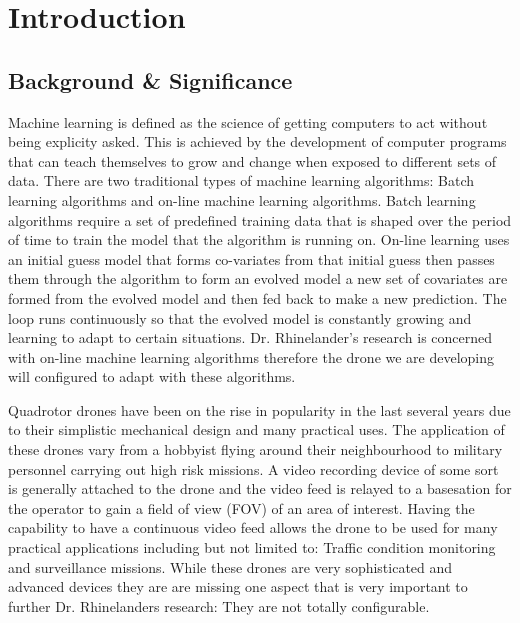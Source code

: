 
\section{Introduction}

\subsection{Background & Significance}


Machine learning is defined as the science of getting computers to act without being explicity asked. This is achieved by the development of computer programs that can teach themselves to grow and change when exposed to different sets of data. There are two traditional types of machine learning algorithms: Batch learning algorithms and on-line machine learning algorithms. Batch learning algorithms require a set of predefined training data that is shaped over the period of time to train the model that the algorithm is running on. On-line learning uses an initial guess model that forms co-variates from that initial guess then passes them through the algorithm to form an evolved model a new set of covariates are formed from the evolved model and then fed back to make a new prediction. The loop runs continuously so that the evolved model is constantly growing and learning to adapt to certain situations. Dr. Rhinelander's research is concerned with on-line machine learning algorithms therefore the drone we are developing will configured to adapt with these algorithms. 

Quadrotor drones have been on the rise in popularity in the last several years due to their simplistic mechanical design and many practical uses. The application of these drones vary from a hobbyist flying around their neighbourhood to military personnel carrying out high risk missions. A video recording device of some sort is generally attached to the drone and the video feed is relayed to a basesation for the operator to gain a field of view (FOV) of an area of interest. Having the capability to have a continuous video feed allows the drone to be used for many practical applications including but not limited to: Traffic condition monitoring and surveillance missions. While these drones are very sophisticated and advanced devices they are are missing one aspect that is very important to further Dr. Rhinelanders research: They are not totally configurable. 

